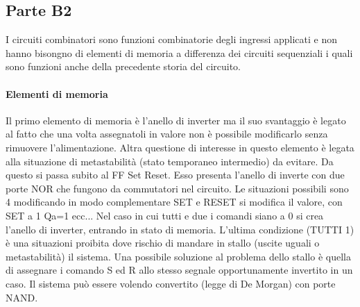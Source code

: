 \documentclass[12pt]{article}
\begin{document}
\subsection{Parte B2}\label{b2}
I circuiti combinatori sono funzioni combinatorie degli ingressi applicati e non hanno bisongno di elementi di memoria a differenza dei circuiti sequenziali i quali sono funzioni anche della precedente storia del circuito.

\paragraph{Elementi di memoria} Il primo elemento di memoria è l'anello di inverter ma il suo svantaggio è legato al fatto che una volta assegnatoli in valore non è possibile modificarlo senza rimuovere l'alimentazione. Altra questione di interesse in questo elemento è legata alla situazione di metastabilità (stato temporaneo intermedio) da evitare. Da questo si passa subito al FF Set Reset. Esso presenta l'anello di inverte con due porte NOR che fungono da commutatori nel circuito. Le situazioni possibili sono 4 modificando in modo complementare SET e RESET si modifica il valore, con SET a 1 Qa=1 ecc... Nel caso in cui tutti e due i comandi siano a 0 si crea l'anello di inverter, entrando in stato di memoria. L'ultima condizione (TUTTI 1) è una situazioni proibita dove rischio di mandare in stallo (uscite uguali o metastabilità) il sistema. Una possibile soluzione al problema dello stallo è quella di assegnare i comando S ed R allo stesso segnale opportunamente invertito in un caso. Il sistema può essere volendo convertito (legge di De Morgan) con porte NAND.
\end{document}
